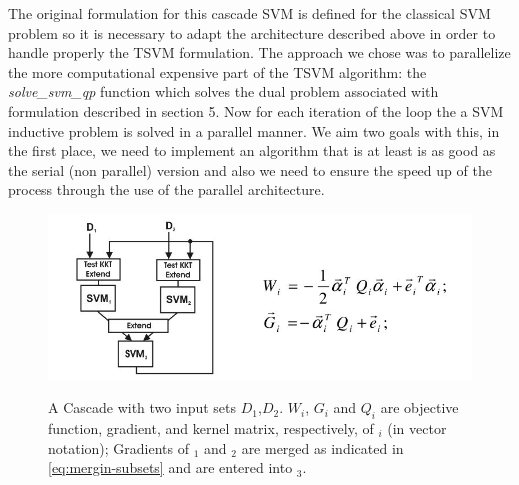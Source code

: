 The original formulation for this cascade SVM is defined for the classical
SVM problem so it is necessary to adapt the architecture described
above in order to handle properly the TSVM formulation. 
The approach we chose was to  parallelize the more computational expensive
part of the TSVM algorithm: the \emph{solve\_svm\_qp} function which
solves the dual problem associated with formulation described in section 5. %
Now for each iteration of the loop the a SVM inductive problem is solved in a parallel manner. We
aim two goals with this, in the first place, we need to
implement an algorithm that is at least is as good as the serial (non
parallel) version and also we need to ensure the speed up of the process
through the use of the parallel architecture.
%
\begin{figure}
\begin{centering}
\includegraphics[scale=0.35]{images/graf-svm-cascade-of-3}\label{fig:graf-3-svm}
\par\end{centering}
\begin{centering}
\caption{A Cascade with two input sets $D_{1}$,$D_{2}$. $W_{i}$, $G_{i}$
and $Q_{i}$ are objective function, gradient, and kernel matrix,
respectively, of $_{i}$ (in vector notation); Gradients
of $_{1}$ and $_{2}$ are merged as indicated
in \ref{eq:mergin-subsets} and are entered into $_{3}$.
\cite{GrafCBDV04}}
\par\end{centering}
\end{figure}
%
